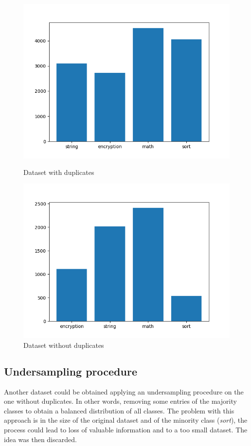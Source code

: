 \documentclass[11pt]{article}
\begin{document}
	\begin{figure}[ht]
		\centering
		\begin{minipage}{.5\textwidth}
		  \centering
		  \includegraphics[width=\linewidth]{assets/dataset.png}
		  \caption{Dataset with duplicates}
		  \label{fig:dataset}
		\end{minipage}%
		\begin{minipage}{.5\textwidth}
		  \centering
		  \includegraphics[width=\linewidth]{assets/datasetnodup.png}
		  \caption{Dataset without duplicates}
		  \label{fig:datasetnodup}
		\end{minipage}
	\end{figure}


	\subsection{Undersampling procedure}
	Another dataset could be obtained applying an undersampling procedure on the
	one without duplicates. 
	In other words, removing some entries of the majority classes to obtain a
	balanced distribution of all classes.
	The problem with this approach is in the size of the original dataset and of
	the minority class (\textit{sort}), the process could lead to loss of valuable
	information and to a too small dataset. The idea was then discarded.
\end{document}
